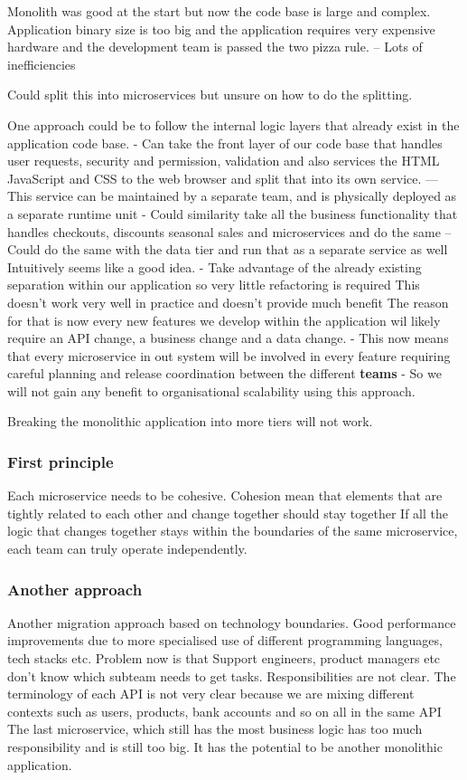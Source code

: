 \documentclass[a4paper, 11pt]{book}
\begin{document}
    Monolith was good at the start but now the code base is large and complex.
    Application binary size is too big and the application requires very expensive hardware and the development team is passed the two pizza rule.
    -- Lots of inefficiencies

    Could split this into microservices but unsure on how to do the splitting.

    One approach could be to follow the internal logic layers that already exist in the application code base.
    - Can take the front layer of our code base that handles user requests, security and permission, validation and also services the HTML JavaScript and CSS to the web browser and split that into its own service.
    --- This service can be maintained by a separate team, and is physically deployed as a separate runtime unit
    - Could similarity take all the business functionality that handles checkouts, discounts seasonal sales and microservices and do the same
    -- Could do the same with the data tier and run that as a separate service as well
    Intuitively seems like a good idea.
    - Take advantage of the already existing separation within our application so very little refactoring is required
    This doesn't work very well in practice and doesn't provide much benefit
    The reason for that is now every new features we develop within the application wil likely require an API change, a business change and a data change.
    - This now means that every microservice in out system will be involved in every feature requiring careful planning and release coordination between the different \textbf{teams}
    - So we will not gain any benefit to organisational scalability using this approach.

    Breaking the monolithic application into more tiers will not work.

    \subsubsection{First principle}
    Each microservice needs to be cohesive.
    Cohesion mean that elements that are tightly related to each other and change together should stay together
    If all the logic that changes together stays within the boundaries of the same microservice, each team can truly operate independently.

    \subsubsection{Another approach}
    Another migration approach based on technology boundaries.
    Good performance improvements due to more specialised use of different programming languages, tech stacks etc.
    Problem now is that Support engineers, product managers etc don't know which subteam needs to get tasks.
    Responsibilities are not clear.
    The terminology of each API is not very clear because we are mixing different contexts such as users, products, bank accounts and so on all in the same API
    The last microservice, which still has the most business logic has too much responsibility and is still too big.
    It has the potential to be another monolithic application.
\end{document}
